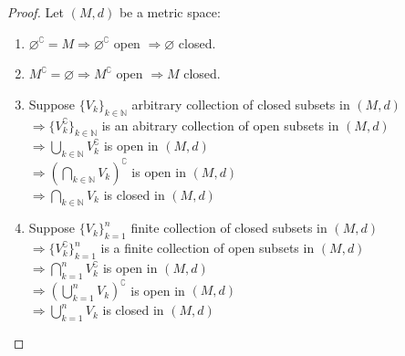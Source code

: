 \documentclass{article}
\begin{document}
			\begin{proof} 
				Let $(M, d)$ be a metric space:
				\begin{enumerate}
					\item $\varnothing^\complement = M \Rightarrow \varnothing^\complement$ open $\Rightarrow\varnothing$ closed.
					\item $M^\complement = \varnothing \Rightarrow M^\complement$ open $\Rightarrow M$ closed.
					\item Suppose $\{V_{k}\}_{k \in \mathbb{N}}$ arbitrary collection of closed subsets in $(M, d)$\\
					$\Rightarrow \{V_{k}^\complement\}_{k \in \mathbb{N}}$ is an abitrary collection of open subsets in $(M, d)$\\
					$\Rightarrow \bigcup_{k \in \mathbb{N}} V_{k}^\complement$ is open in $(M, d)$\\
					$\Rightarrow (\bigcap_{k \in \mathbb{N}} V_{k})^\complement$ is open in $(M, d)$\\
					$\Rightarrow \bigcap_{k \in \mathbb{N}} V_{k}$ is closed in $(M, d)$
					\item Suppose $\{V_{k}\}_{k=1}^{n}$ finite collection of closed subsets in $(M, d)$\\
					$\Rightarrow \{V_{k}^\complement\}_{k=1}^{n}$ is a finite collection of open subsets in $(M, d)$\\
					$\Rightarrow \bigcap_{k=1}^{n} V_{k}^\complement$ is open in $(M, d)$\\
					$\Rightarrow (\bigcup_{k=1}^{n} V_{k})^\complement$ is open in $(M, d)$\\
					$\Rightarrow \bigcup_{k=1}^{n} V_{k}$ is closed in $(M, d)$
				\end{enumerate}
			\end{proof}
\end{document}
